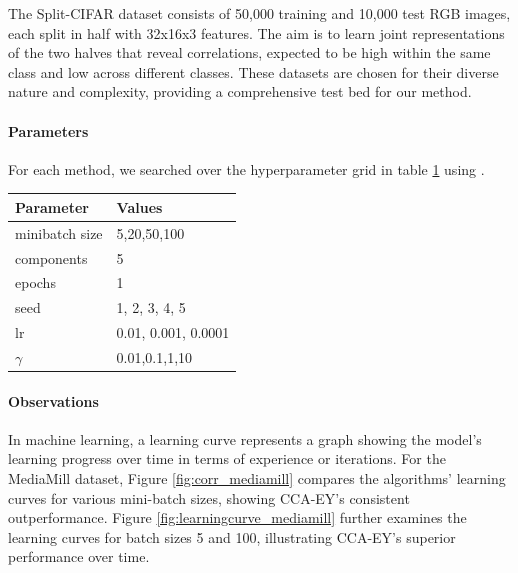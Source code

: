 The Split-CIFAR dataset \citep{meng2021online} consists of 50,000 training and 10,000 test RGB images, each split in half with 32x16x3 features.
The aim is to learn joint representations of the two halves that reveal correlations, expected to be high within the same class and low across different classes.
These datasets are chosen for their diverse nature and complexity, providing a comprehensive test bed for our method.

\paragraph{Parameters} For each method, we searched over the hyperparameter grid in table \ref{tab:hyperparameters} using \citet{wandb}.

\begin{table}[h!]
    \centering
    \begin{tabular}{|l|l|}
        \hline Parameter             & Values              \\
        \hline minibatch size        & 5,20,50,100         \\
        \hline components            & 5                   \\
        \hline epochs                & 1                   \\
        \hline seed                  & 1, 2, 3, 4, 5       \\
        \hline lr                    & 0.01, 0.001, 0.0001 \\
        \hline $\gamma$\footnotemark & 0.01,0.1,1,10       \\
        \hline
    \end{tabular}
    \label{tab:hyperparameters}
\end{table}

\paragraph{Observations}
In machine learning, a learning curve represents a graph showing the model's learning progress over time in terms of experience or iterations.
For the MediaMill dataset, Figure \ref{fig:corr_mediamill} compares the algorithms' learning curves for various mini-batch sizes, showing CCA-EY's consistent outperformance. Figure \ref{fig:learningcurve_mediamill} further examines the learning curves for batch sizes 5 and 100, illustrating CCA-EY's superior performance over time.

